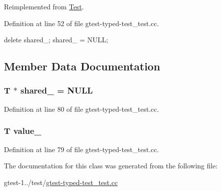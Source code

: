 \-Reimplemented from \hyperlink{classtesting_1_1Test_aaff0dc66f57f643a49ad3dd6bcb56916}{\-Test}.



\-Definition at line 52 of file gtest-\/typed-\/test\-\_\-test.\-cc.


\begin{DoxyCode}
                                 {
    delete shared_;
    shared_ = NULL;
  }
\end{DoxyCode}


\subsection{\-Member \-Data \-Documentation}
\hypertarget{classCommonTest_a010d6ea1d71d7d6ba83d605dcde333af}{
\subsubsection[{shared\-\_\-}]{\setlength{\rightskip}{0pt plus 5cm}\-T $\ast$ {\bf shared\-\_\-} = \-N\-U\-L\-L}}\label{de/d53/classCommonTest_a010d6ea1d71d7d6ba83d605dcde333af}


\-Definition at line 80 of file gtest-\/typed-\/test\-\_\-test.\-cc.

\hypertarget{classCommonTest_ae496c0f6edafccdab7ef2e2b9d0c7e03}{
\subsubsection[{value\-\_\-}]{\setlength{\rightskip}{0pt plus 5cm}\-T {\bf value\-\_\-}}}\label{de/d53/classCommonTest_ae496c0f6edafccdab7ef2e2b9d0c7e03}


\-Definition at line 79 of file gtest-\/typed-\/test\-\_\-test.\-cc.



\-The documentation for this class was generated from the following file\-:\begin{DoxyCompactItemize}
\item 
gtest-\/1../test/\hyperlink{gtest-typed-test__test_8cc}{gtest-\/typed-\/test\-\_\-test.\-cc}\end{DoxyCompactItemize}
